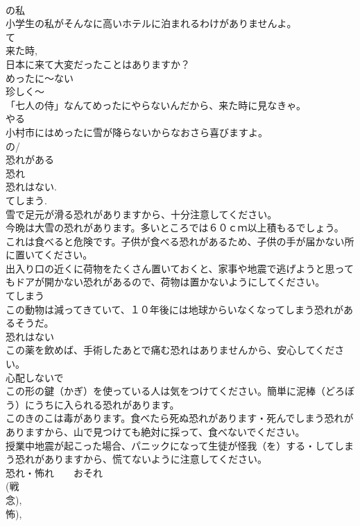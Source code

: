 \documentclass[8pt]{extreport}
\begin{document}
\begin{CJK}{UTF8}{min}
\\	の私
\\	小学生の私がそんなに高いホテルに泊まれるわけがありませんよ。
\\	て 
\\	来た時, 
\\	日本に来て大変だったことはありますか？
\\	めったに～ない
\\	珍しく～
\\	「七人の侍」なんてめったにやらないんだから、来た時に見なきゃ。
\\	やる 
\\	小村市にはめったに雪が降らないからなおさら喜びますよ。
\\	の/
\\	恐れがある
\\	恐れ 
\\	恐れはない. 
\\	てしまう. 
\\	雪で足元が滑る恐れがありますから、十分注意してください。
\\	今晩は大雪の恐れがあります。多いところでは６０ｃｍ以上積もるでしょう。
\\	これは食べると危険です。子供が食べる恐れがあるため、子供の手が届かない所に置いてください。
\\	出入り口の近くに荷物をたくさん置いておくと、家事や地震で逃げようと思ってもドアが開かない恐れがあるので、荷物は置かないようにしてください。
\\	てしまう 
\\	この動物は減ってきていて、１０年後には地球からいなくなってしまう恐れがあるそうだ。
\\	恐れはない 
\\	この薬を飲めば、手術したあとで痛む恐れはありませんから、安心してください。
\\	心配しないで
\\	この形の鍵（かぎ）を使っている人は気をつけてください。簡単に泥棒（どろぼう）にうちに入られる恐れがあります。
\\	このきのこは毒があります。食べたら死ぬ恐れがあります・死んでしまう恐れがありますから、山で見つけても絶対に採って、食べないでください。
\\	授業中地震が起こった場合、パニックになって生徒が怪我（を）する・してしまう恐れがありますから、慌てないように注意してください。
\\	恐れ・怖れ　　おそれ
\\	(戦
\\	念), 
\\	怖), 

\end{CJK}
\end{document}
